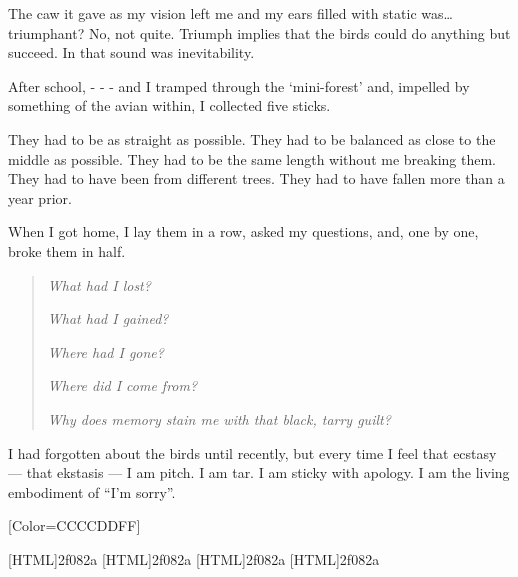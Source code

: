 \begin{paracol}{2}
\begin{leftcolumn}
The caw it gave as my vision left me and my ears filled with static was\ldots{}triumphant? No, not quite. Triumph implies that the birds could do anything but succeed. In that sound was inevitability.

After school, - - - and I tramped through the `mini-forest' and, impelled by something of the avian within, I collected five sticks.

They had to be as straight as possible.
They had to be balanced as close to the middle as possible.
They had to be the same length without me breaking them.
They had to have been from different trees.
They had to have fallen more than a year prior.

When I got home, I lay them in a row, asked my questions, and, one by one, broke them in half.

\begin{quotation}
\emph{What had I lost?}

\emph{What had I gained?}

\emph{Where had I gone?}

\emph{Where did I come from?}

\emph{Why does memory stain me with that black, tarry guilt?}
\end{quotation}

I had forgotten about the birds until recently, but every time I feel that ecstasy --- that ekstasis --- I am pitch. I am tar. I am sticky with apology. I am the living embodiment of ``I'm sorry''.
\newpage
\end{leftcolumn}
\end{paracol}
\resetbackgroundcolor


\renewfontfamily{}[Color=CCCCDDFF]

[HTML]{2f082a}
[HTML]{2f082a}
[HTML]{2f082a}
[HTML]{2f082a}


